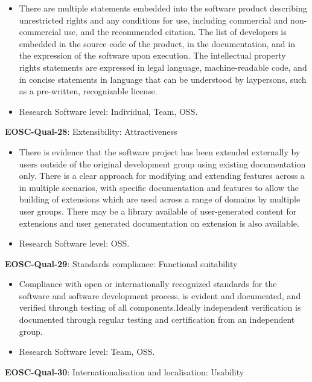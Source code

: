 \begin{itemize}
    \item There are multiple statements embedded into the software product describing unrestricted rights and any conditions for use, including commercial and non-commercial use, and the recommended citation. The list of developers is embedded in the source code of the product, in the documentation, and in the expression of the software upon execution. The intellectual property rights statements are expressed in legal language, machine-readable code, and in concise statements in language that can be understood by laypersons, such as a pre-written, recognizable license. \cite{shepherdson_cessda_2019}
    \item Research Software level: Individual, Team, OSS.
\end{itemize}

\textbf{EOSC-Qual-28}: Extensibility: Attractiveness

\begin{itemize}
    \item There is evidence that the software project has been extended externally by users outside of the original development group using existing documentation only. There is a clear approach for modifying and extending features across a in multiple scenarios, with specific documentation and features to allow the building of extensions which are used across a range of domains by multiple user groups. There may be a library available of user-generated content for extensions and user generated documentation on extension is also available. \cite{shepherdson_cessda_2019}
    \item Research Software level: OSS.
\end{itemize}

\textbf{EOSC-Qual-29}: Standards compliance: Functional suitability

\begin{itemize}
    \item Compliance with open or internationally recognized standards for the software and software development process, is evident and documented, and verified through testing of all components.Ideally independent verification is documented through regular testing and certification from an independent group. \cite{shepherdson_cessda_2019}
    \item Research Software level: Team, OSS.
\end{itemize}

\textbf{EOSC-Qual-30}: Internationalisation and localisation: Usability

